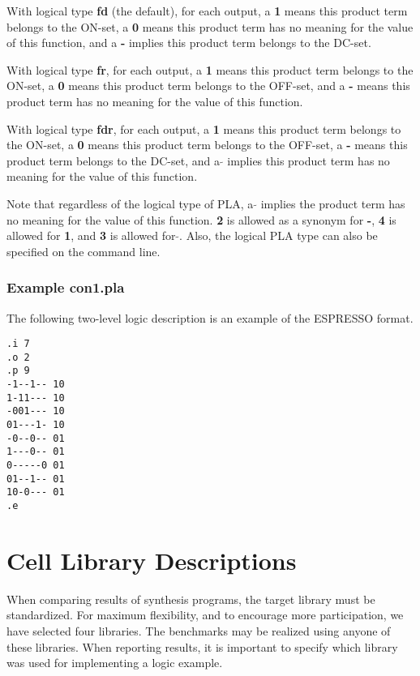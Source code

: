 {\begin{pespace}
     With logical type {\bf fd} (the default), for each output, a {\bf 1}
     means this product term belongs to the ON-set, a {\bf 0} means
     this product term has no meaning for the value of this function, 
and a {\bf -} implies this product term belongs to the DC-set.

     With logical type {\bf fr}, for each output, a {\bf 1} means this product 
term belongs to the ON-set, a {\bf 0} means this product term
     belongs to the OFF-set, and a {\bf -} means this product term has
     no meaning for the value of this function.

     With logical type {\bf fdr}, for each output, a {\bf 1} means this 
product term belongs to the ON-set, a {\bf 0} means this product term
     belongs to the OFF-set, a {\bf -} means this product term belongs
     to the DC-set, and a {\bf  $\tilde{}$} implies this product term has no
     meaning for the value of this function.


     Note that regardless of the logical type of PLA, a {\bf  $\tilde{}$} implies
     the product term has no meaning for the value of this function.  
     {\bf 2} is allowed as a synonym for {\bf -},  {\bf 4} 
is allowed for {\bf 1},
     and {\bf 3} is allowed for {\bf  $\tilde{}$}.  Also, the logical PLA type can also
     be specified on the command line.
 


\subsubsection{   Example con1.pla}
The following two-level logic description is an example of the
ESPRESSO format.


\begin{verbatim}
.i 7
.o 2
.p 9
-1--1-- 10
1-11--- 10
-001--- 10
01---1- 10
-0--0-- 01
1---0-- 01
0-----0 01
01--1-- 01
10-0--- 01
.e
\end{verbatim}


\newpage
\section{ Cell Library Descriptions}
When comparing results of synthesis programs, the 
target library must be standardized.  For maximum flexibility,
and to encourage more participation, we have selected four libraries.
The benchmarks may be realized using anyone of these libraries.  When reporting 
results, it is important to specify which library was used for implementing
a logic example. 


\end{pespace}}
